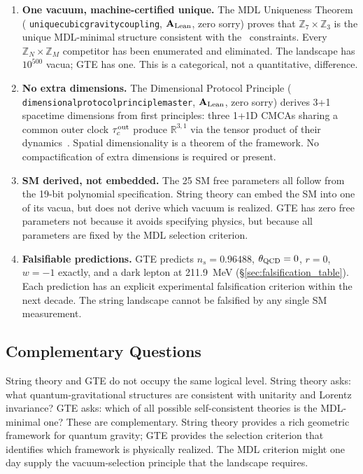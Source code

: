 \documentclass[11pt,openany]{book}
\theoremstyle{remark}
\newcommand{\PSC}{\text{PSC}}
\newcommand{\ZS}{\mathbb{Z}_7}
\newcommand{\lean}[1]{%
  \penalty-100
  \begingroup\def\_{\textunderscore\allowbreak}\texttt{#1}\endgroup}
\newcommand{\CatAL}{\ensuremath{\textbf{A}_{\rm Lean}}}
\begin{document}
\begin{enumerate}
\item \textbf{One vacuum, machine-certified unique.}
The MDL Uniqueness Theorem (\lean{unique\_cubic\_gravity\_coupling}, \CatAL, zero sorry)
proves that $\ZS\times\mathbb{Z}_3$ is the unique MDL-minimal structure consistent
with the \PSC\ constraints.  Every $\mathbb{Z}_N\times\mathbb{Z}_M$ competitor has been
enumerated and eliminated.  The landscape has $10^{500}$ vacua; GTE has one.  This is a
categorical, not a quantitative, difference.

\item \textbf{No extra dimensions.}
The Dimensional Protocol Principle (\lean{dimensional\_protocol\_principle\_master},
\CatAL, zero sorry) derives 3+1 spacetime dimensions from first principles: three 1+1D
CMCAs sharing a common outer clock $\tau_c^{\rm out}$ produce $\mathbb{R}^{3,1}$
via the tensor product of their dynamics~\cite{SpivackThreeTapeCMCA}.  Spatial
dimensionality is a theorem of the framework.  No compactification of extra dimensions is
required or present.

\item \textbf{SM derived, not embedded.}
The 25 SM free parameters all follow from the 19-bit polynomial specification.  String
theory can embed the SM into one of its vacua, but does not derive which vacuum is
realized.  GTE has zero free parameters not because it avoids specifying physics, but
because all parameters are fixed by the MDL selection criterion.

\item \textbf{Falsifiable predictions.}
GTE predicts $n_s = 0.96488$, $\theta_{\rm QCD} = 0$, $r = 0$, $w = -1$ exactly, and a
dark lepton at 211.9~MeV (§\ref{sec:falsification_table}).  Each prediction has an
explicit experimental falsification criterion within the next decade.  The string
landscape cannot be falsified by any single SM measurement.
\end{enumerate}

\subsection*{Complementary Questions}

String theory and GTE do not occupy the same logical level.  String theory asks: what
quantum-gravitational structures are consistent with unitarity and Lorentz invariance?
GTE asks: which of all possible self-consistent theories is the MDL-minimal one?  These
are complementary.  String theory provides a rich geometric framework for quantum gravity;
GTE provides the selection criterion that identifies which framework is physically
realized.  The MDL criterion might one day supply the vacuum-selection principle that the
landscape requires.
\end{document}
